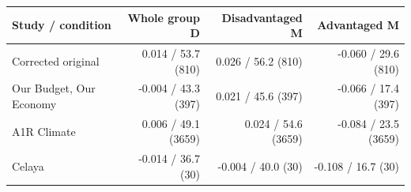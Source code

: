 
\begin{tabular}{lrrr}
\toprule
Study / condition & Whole group D & Disadvantaged M & Advantaged M\\
\midrule
Corrected original & 0.014 / 53.7 (810) & 0.026 / 56.2 (810) & -0.060 / 29.6 (810)\\
Our Budget, Our Economy & -0.004 / 43.3 (397) & 0.021 / 45.6 (397) & -0.066 / 17.4 (397)\\
A1R Climate & 0.006 / 49.1 (3659) & 0.024 / 54.6 (3659) & -0.084 / 23.5 (3659)\\
Celaya & -0.014 / 36.7 (30) & -0.004 / 40.0 (30) & -0.108 / 16.7 (30)\\
\bottomrule
\end{tabular}
